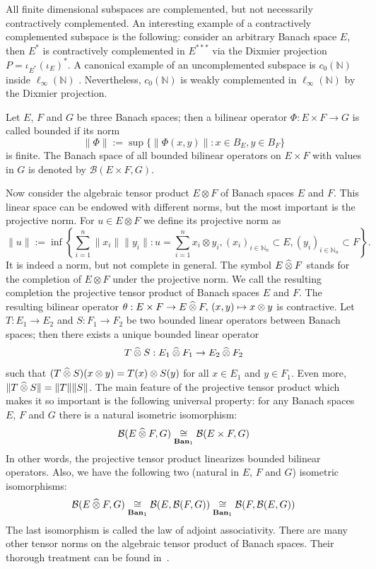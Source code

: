 All finite dimensional subspaces are complemented, but not necessarily
contractively complemented. An interesting example of a contractively 
complemented subspace is the following: consider an arbitrary Banach space $E$, 
then $E^*$ is contractively complemented in $E^{***}$ via the Dixmier 
projection $P=\iota_{E^*}{(\iota_E)}^*$. A canonical example of an uncomplemented 
subspace is $c_0(\mathbb{N})$ 
inside $\ell_\infty(\mathbb{N})$ \cite[theorem 2.5.5]{KalAlbTopicsBanSpTh}.
Nevertheless, $c_0(\mathbb{N})$ is weakly complemented in
$\ell_\infty(\mathbb{N})$ by the Dixmier projection.

Let $E$, $F$ and $G$ be three Banach spaces; then a bilinear operator
$\Phi:E\times F\to G$ is called bounded if its norm 
\[
\lVert \Phi\rVert:=\sup \{\lVert \Phi(x,y)\rVert:x\in B_E, y\in B_F \}
\] 
is finite. 
The Banach space of all bounded bilinear operators on $E\times F$ with 
values in $G$ is denoted by $\mathcal{B}(E\times F,G)$.

Now consider the algebraic tensor product $E\otimes F$ of Banach spaces $E$ and
$F$. This linear space can be endowed with different norms, but the most
important is the projective norm. For $u\in E\otimes F$ we define its projective
norm as
\[
\lVert u\rVert
:=\inf\left \{
  \sum_{i=1}^n \lVert x_i\rVert\lVert y_i\rVert
  :u=\sum_{i=1}^n x_i\otimes y_i, 
  {(x_i)}_{i\in\mathbb{N}_n}\subset E, 
  {(y_i)}_{i\in\mathbb{N}_n}\subset F
\right \}.
\]
It is indeed a norm, but not complete in general. The symbol $E\mathbin{\widehat{\otimes}} F$
stands for the completion of $E\otimes F$ under the projective norm. We call the
resulting completion the projective tensor product of Banach spaces $E$ and $F$.
The resulting bilinear operator 
$\theta:E\times F\to E\mathbin{\widehat{\otimes}} F,\,(x,y)\mapsto x\otimes y$ is contractive.
Let $T:E_1\to E_2$ and $S:F_1\to F_2$ be two bounded linear operators between
Banach spaces; then there exists a unique bounded linear operator 
\[
T\mathbin{\widehat{\otimes}} S:E_1\mathbin{\widehat{\otimes}} F_1\to E_2\mathbin{\widehat{\otimes}} F_2
\] 
such that  $(T\mathbin{\widehat{\otimes}} S)(x\otimes y)=T(x)\otimes S(y)$ 
for all $x\in E_1$ and $y\in F_1$. 
Even more, $\lVert T\mathbin{\widehat{\otimes}} S\rVert=\lVert T\rVert\lVert S\rVert$. The main feature 
of the projective tensor product which makes it so important is the following 
universal property: for any Banach spaces $E$, $F$ and $G$ there is a 
natural isometric isomorphism:
\[
\mathcal{B}(E\mathbin{\widehat{\otimes}} F,G)\mathrel{\mathop{\cong}\limits_{\mathbf{Ban}_1}}\mathcal{B}(E\times F,G)
\]
In other words, the projective tensor product linearizes bounded bilinear operators.
Also, we have the following two (natural in $E$, $F$ and $G$) isometric
isomorphisms:
\[
\mathcal{B}(E\mathbin{\widehat{\otimes}} F,G)
\mathrel{\mathop{\cong}\limits_{\mathbf{Ban}_1}}\mathcal{B}(E,\mathcal{B}(F,G))
\mathrel{\mathop{\cong}\limits_{\mathbf{Ban}_1}}\mathcal{B}(F,\mathcal{B}(E,G))
\]
The last isomorphism is called the law of adjoint associativity. There are many
other tensor norms on the algebraic tensor product of Banach spaces. Their
thorough treatment can be found in~\cite{DiestMetTheoryOfTensProd}.

